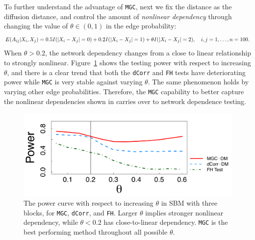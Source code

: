 \documentclass[11pt]{article}
\theoremstyle{definition}
\begin{document}
To further understand the advantage of \texttt{MGC}, next we fix the distance as the diffusion distance, and control the amount of \textit{nonlinear dependency} through changing the value of $\theta \in (0, 1)$ in the edge probability:
\begin{equation}
E(A_{ij} | X_{i}, X_{j}) = 0.5 I(|X_{i} - X_{j}| = 0) + 0.2 I(|X_{i} - X_{j}| = 1) + \theta I(|X_{i} - X_{j}| = 2), \quad i,j = 1, \ldots, n = 100.
\label{eq:mono}
\vspace*{-0.4cm}
\end{equation}
When $\theta > 0.2$, the network dependency changes from a close to linear relationship to strongly nonlinear. Figure~\ref{fig:powerplot} shows the testing power with respect to increasing $\theta$, and there is a clear trend that both the \texttt{dCorr} and \texttt{FH} tests have deteriorating power while \texttt{MGC} is very stable against varying $\theta$. The same phenomenon holds by varying other edge probabilities. Therefore, the \texttt{MGC} capability to better capture the nonlinear dependencies shown in \cite{shen2016discovering} carries over to network dependence testing.
\begin{figure}[ht]
	\centering
	\includegraphics[width=0.7\linewidth]{mono_short.pdf}
	\caption{The power curve with respect to increasing $\theta$ in SBM with three blocks, for \texttt{MGC}, \texttt{dCorr}, and \texttt{FH}. Larger $\theta$ implies stronger nonlinear dependency, while $\theta<0.2$ has close-to-linear dependency. \texttt{MGC} is the best performing method throughout all possible $\theta$.}
	\label{fig:powerplot}
\end{figure}
\end{document}
